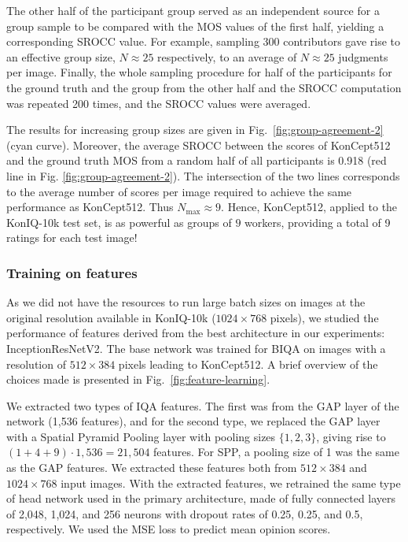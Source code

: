 \documentclass[10pt,journal,compsoc]{IEEEtran}
\begin{document}
The other half of the participant group served as an independent source for a group sample to be compared with the MOS values of the first half, yielding a corresponding SROCC value. For example, sampling 300 contributors gave rise to an effective group size, $N \approx 25$ respectively, to an average of $N \approx 25$ judgments per image. Finally, the whole sampling procedure for half of the participants for the ground truth and the group from the other half and the SROCC computation was repeated 200 times, and the SROCC values were averaged.

The results for increasing group sizes are given in Fig.\ \ref{fig:group-agreement-2} (cyan curve). Moreover, the average SROCC between the scores of KonCept512 and the ground truth MOS from a random half of all participants is 0.918  (red line in Fig. \ref{fig:group-agreement-2}). The intersection of the two lines corresponds to the average number of scores per image required to achieve the same performance as KonCept512. Thus $N_\text{max} \approx 9$. Hence, KonCept512, applied to the KonIQ-10k test set, is as powerful as groups of $9$ workers, providing a total of 9 ratings for each test image!


\subsubsection{Training on features}

As we did not have the resources to run large batch sizes on images at the original resolution available in KonIQ-10k ($1024\times768$ pixels), we studied the performance of features derived from the best architecture in our experiments: InceptionResNetV2. The base network was trained for BIQA on images with a resolution of $512\times384$ pixels leading to KonCept512. A brief overview of the choices made is presented in Fig.~\ref{fig:feature-learning}.

We extracted two types of IQA features. The first was from the GAP layer of the network (1,536 features), and for the second type, we replaced the GAP layer with a Spatial Pyramid Pooling layer with pooling sizes $\{1,2,3\}$, giving rise to $(1+4+9)\cdot 1,536 =  21,504$ features. For SPP, a pooling size of 1 was the same as the GAP features. We extracted these features both from $512\times384$ and $1024\times768$ input images. With the extracted features, we retrained the same type of head network used in the primary architecture, made of fully connected layers of 2,048, 1,024, and 256 neurons with dropout rates of 0.25, 0.25, and 0.5, respectively. We used the MSE loss to predict mean opinion scores.
\end{document}
